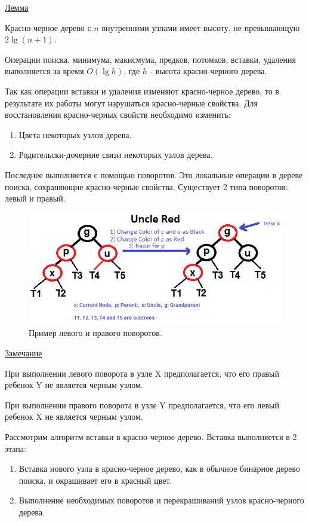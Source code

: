 \underline{Лемма}

Красно-черное дерево с $n$ внутренними узлами имеет высоту, не превышающую 
$2\lg(n+1)$.

Операции поиска, минимума, макисмума, предков, потомков, вставки, удаления выполняется 
за время $O(\lg h)$, где $h$ - высота красно-черного дерева.

Так как операции вставки и удаления изменяют красно-черное дерево,
то в результате их работы могут нарушаться красно-черные свойства. 
Для восстановления красно-черных свойств необходимо изменить:
\begin{enumerate}
	\item Цвета некоторых узлов дерева.
	\item Родительски-дочерние связи некоторых узлов дерева.
\end{enumerate}

Последнее выполняется с помощью поворотов. Это локальные операции в
дереве поиска, сохраняющие красно-черные свойства.
Существует 2 типа поворотов: левый и правый.

\begin{figure}[H]
\centering
\includegraphics[width=\textwidth]{img/tan-aus.png}
\caption{\label{fig:tan-aus}Пример левого и правого поворотов.}
\end{figure}

\underline{Замечание}

	При выполнении левого поворота в узле X предполагается, что
	его правый ребенок Y не является черным узлом.
	
	При выполнении правого поворота в узле Y предполагается, что
	его левый ребенок X не является черным узлом.

Рассмотрим алгоритм вставки в красно-черное дерево. Вставка выполняется в 2 этапа:
\begin{enumerate}
	\item Вставка нового узла в красно-черное дерево, как в обычное бинарное
		  дерево поиска, и окрашивает его в красный цвет.
	\item Выполнение необходимых поворотов и перекрашиваний узлов 
		  красно-черного дерева.
\end{enumerate}

